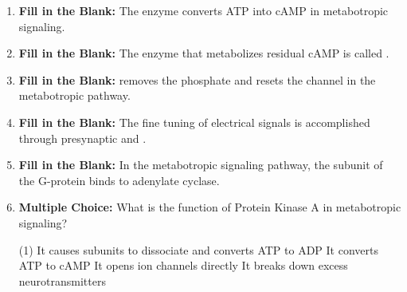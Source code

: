 \begin{enumerate}[label=\textbf{Q2.5.\arabic*}]
      \item \textbf{Fill in the Blank:} The enzyme \underline{\hspace{3cm}} converts ATP into cAMP in metabotropic signaling. \\

      \item \textbf{Fill in the Blank:} The enzyme that metabolizes residual cAMP is called \underline{\hspace{3cm}}. \\
            
      \item \textbf{Fill in the Blank:} \underline{\hspace{3cm}} removes the phosphate and resets the channel in the metabotropic pathway. \\

      \item \textbf{Fill in the Blank:} The fine tuning of electrical signals is accomplished through presynaptic \underline{\hspace{3cm}} and \underline{\hspace{3cm}}. \\

      \item \textbf{Fill in the Blank:} In the metabotropic signaling pathway, the \underline{\hspace{3cm}} subunit of the G-protein binds to adenylate cyclase. \\
            
      \item \textbf{Multiple Choice:} What is the function of Protein Kinase A in metabotropic signaling?
            \begin{tasks}[label=\textcolor{draculafg}{(\Alph*)}, item-format=\color{draculafg}, label-width=1.5em, item-indent=1.7em](1)
                  \task It causes subunits to dissociate and converts ATP to ADP
                  \task It converts ATP to cAMP
                  \task It opens ion channels directly
                  \task It breaks down excess neurotransmitters
            \end{tasks}
            
\newpage
      

\end{enumerate}

